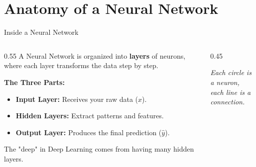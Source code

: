 \section{Anatomy of a Neural Network}

\begin{frame}{Inside a Neural Network}
    \begin{columns}[c]
        \begin{column}{0.55\textwidth}
            A Neural Network is organized into \textbf{layers} of neurons, where each layer transforms the data step by step.
            
            \vspace{1em}
            \textbf{The Three Parts:}
            \begin{itemize}
                \item \textbf{Input Layer:} Receives your raw data ($x$).
                \item \textbf{Hidden Layers:} Extract patterns and features.
                \item \textbf{Output Layer:} Produces the final prediction ($\hat{y}$).
            \end{itemize}
            
            \vspace{0.8em}
            \small The "deep" in Deep Learning comes from having many hidden layers.
        \end{column}
        
        \begin{column}{0.45\textwidth}
            \centering
            
            \vspace{1em}
            \small \textit{Each circle is a neuron,\\each line is a connection.}
        \end{column}
    \end{columns}

\end{frame}

